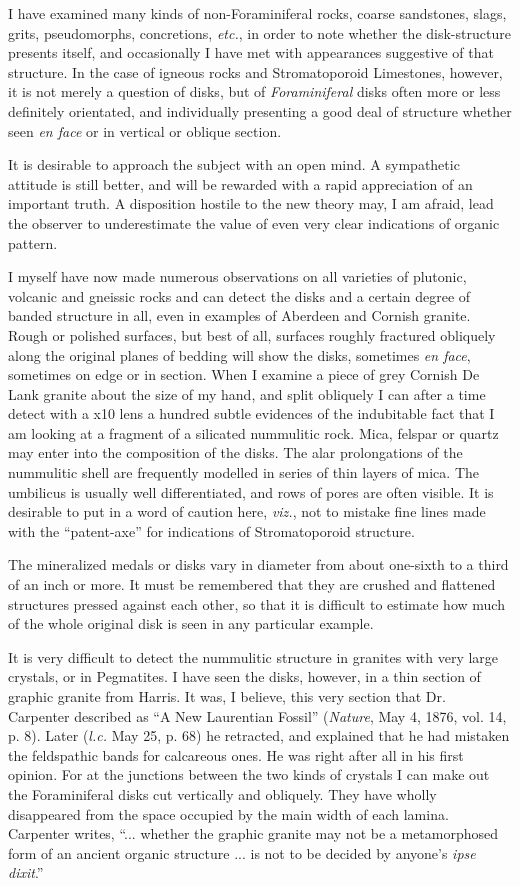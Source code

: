 \documentclass[a4paper, 12pt, oneside]{article}
\begin{document}
I have examined many kinds of non-Foraminiferal rocks, coarse sandstones, slags, grits, pseudomorphs, concretions, \emph{etc.}, in order to note whether the disk-structure presents itself, and occasionally I have met with appearances suggestive of that structure. In the case of igneous rocks and Stromatoporoid Limestones, however, it is not merely a question of disks, but of \emph{Foraminiferal} disks often more or less definitely orientated, and individually presenting a good deal of structure whether seen \emph{en face} or in vertical or oblique section.

It is desirable to approach the subject with an open mind. A sympathetic attitude is still better, and will be rewarded with a rapid appreciation of an important truth. A disposition hostile to the new theory may, I am afraid, lead the observer to underestimate the value of even very clear indications of organic pattern.

I myself have now made numerous observations on all varieties of plutonic, volcanic and gneissic rocks and can detect the disks and a certain degree of banded structure in all, even in examples of Aberdeen and Cornish granite. Rough or polished surfaces, but best of all, surfaces roughly fractured obliquely along the original planes of bedding will show the disks, sometimes \emph{en face}, sometimes on edge or in section. When I examine a piece of grey Cornish De Lank granite about the size of my hand, and split obliquely I can after a time detect with a x10 lens a hundred subtle evidences of the indubitable fact that I am looking at a fragment of a silicated nummulitic rock. Mica, felspar or quartz may enter into the composition of the disks. The alar prolongations of the nummulitic shell are frequently modelled in series of thin layers of mica. The umbilicus is usually well differentiated, and rows of pores are often visible. It is desirable to put in a word of caution here, \emph{viz.}, not to mistake fine lines made with the ``patent-axe'' for indications of Stromatoporoid structure.

The mineralized medals or disks vary in diameter from about one-sixth to a third of an inch or more. It must be remembered that they are crushed and flattened structures pressed against each other, so that it is difficult to estimate how much of the whole original disk is seen in any particular example.

It is very difficult to detect the nummulitic structure in granites with very large crystals, or in Pegmatites. I have seen the disks, however, in a thin section of graphic granite from Harris. It was, I believe, this very section that Dr. Carpenter described as ``A New Laurentian Fossil'' (\emph{Nature}, May 4, 1876, vol. 14, p. 8). Later (\emph{l.c.} May 25, p. 68) he retracted, and explained that he had mistaken the feldspathic bands for calcareous ones. He was right after all in his first opinion. For at the junctions between the two kinds of crystals I can make out the Foraminiferal disks cut vertically and obliquely. They have wholly disappeared from the space occupied by the main width of each lamina. Carpenter writes, ``... whether the graphic granite may not be a metamorphosed form of an ancient organic structure ... is not to be decided by anyone's \emph{ipse dixit}.''
\end{document}
